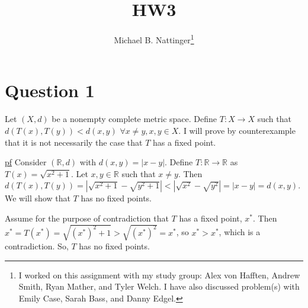 \documentclass[11pt]{article} %
\title{HW3}
\author{Michael B. Nattinger\footnote{I worked on this assignment with my study group: Alex von Hafften, Andrew Smith, Ryan Mather, and Tyler Welch. I have also discussed problem(s) with Emily Case, Sarah Bass, and Danny Edgel.}}
\begin{document}
\maketitle

\section{Question 1}
Let $(X, d)$ be a nonempty complete metric space. Define $T: X \rightarrow X$ such that $d(T(x),T(y))<d(x,y)$ $\forall x \neq y, x,y \in X.$ I will prove by counterexample that it is not necessarily the case that $T$ has a fixed point.

\underline{pf} Consider $(\mathbb{R},d)$ with $d(x,y) = |x-y|$. Define $T: \mathbb{R} \rightarrow \mathbb{R}$ as $T(x) = \sqrt{x^2 + 1}$. Let $x,y \in \mathbb{R}$ such that $x \neq y$. Then $d(T(x),T(y)) = |\sqrt{x^2 + 1} - \sqrt{y^2 +1}| < |\sqrt{x^2} - \sqrt{y^2}| = |x - y| = d(x,y)$. We will show that $T$ has no fixed points.

Assume for the purpose of contradiction that $T$ has a fixed point, $x^*$. Then $x^* = T(x^*) = \sqrt{(x^*)^2 + 1} > \sqrt{(x^*)^2} = x^*$, so $x^* > x^*$, which is a contradiction. So, $T$ has no fixed points.

%
\end{document}
